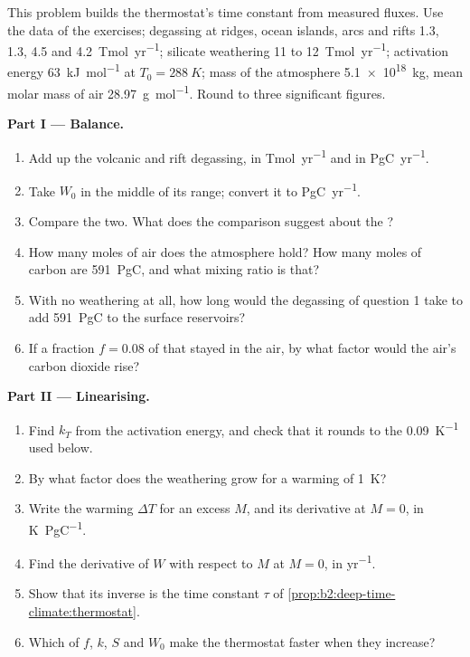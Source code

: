 \begin{problem}\label{pb:b2:deep-time-climate:1}
This problem builds the thermostat's time constant from measured fluxes. Use the data of the
exercises; degassing at ridges, ocean islands, arcs and rifts \num{1.3}, \num{1.3}, 4.5 and
\qty{4.2}{Tmol.yr^{-1}}; silicate weathering 11 to \qty{12}{Tmol.yr^{-1}}; activation energy
\qty{63}{kJ.mol^{-1}} at $T_0 = \qty{288}{K}$; mass of the atmosphere \qty{5.1e18}{kg}, mean molar
mass of air \qty{28.97}{g.mol^{-1}}. Round to three significant figures.

\noindent\textbf{Part I --- Balance.}
\begin{enumerate}
  \item Add up the volcanic and rift degassing, in \unit{Tmol.yr^{-1}} and in \unit{PgC.yr^{-1}}.
  \item Take $W_0$ in the middle of its range; convert it to \unit{PgC.yr^{-1}}.
  \item Compare the two. What does the comparison suggest about the ?
  \item How many moles of air does the atmosphere hold? How many moles of carbon are \qty{591}{PgC},
        and what mixing ratio is that?
  \item With no weathering at all, how long would the degassing of question 1 take to add
        \qty{591}{PgC} to the surface reservoirs?
  \item If a fraction $f = 0.08$ of that stayed in the air, by what factor would the air's carbon
        dioxide rise?
\end{enumerate}

\noindent\textbf{Part II --- Linearising.}
\begin{enumerate}[resume]
  \item Find $k_T$ from the activation energy, and check that it rounds to the
        \qty{0.09}{K^{-1}} used below.
  \item By what factor does the weathering grow for a warming of \qty{1}{K}?
  \item Write the warming $\Delta T$ for an excess $M$, and its derivative at $M = 0$, in
        \unit{K.PgC^{-1}}.
  \item Find the derivative of $W$ with respect to $M$ at $M = 0$, in \unit{yr^{-1}}.
  \item Show that its inverse is the time constant $\tau$ of
        \cref{prop:b2:deep-time-climate:thermostat}.
  \item Which of $f$, $k$, $S$ and $W_0$ make the thermostat faster when they increase?
\end{enumerate}


\end{problem}
